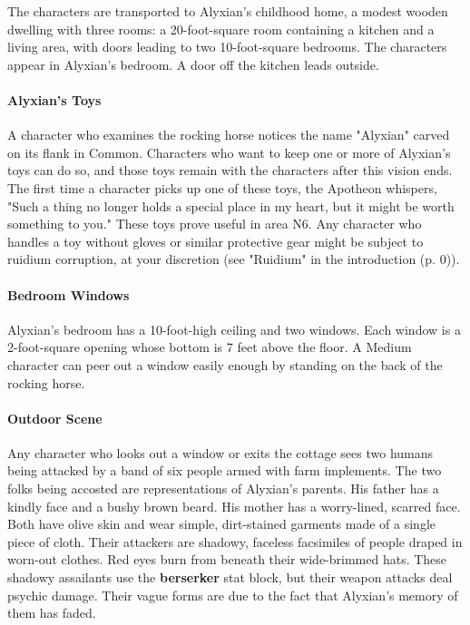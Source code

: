 \documentclass[a4paper, 11pt, bg=full, twocolumn, nooutline]{dndbook}
\begin{document}
The characters are transported to Alyxian's childhood home, a modest wooden dwelling with three rooms: a 20-foot-square room containing a kitchen and a living area, with doors leading to two 10-foot-square bedrooms. The characters appear in Alyxian's bedroom. A door off the kitchen leads outside.


\paragraph{Alyxian's Toys}

A character who examines the rocking horse notices the name "Alyxian" carved on its flank in Common. Characters who want to keep one or more of Alyxian's toys can do so, and those toys remain with the characters after this vision ends. The first time a character picks up one of these toys, the Apotheon whispers, "Such a thing no longer holds a special place in my heart, but it might be worth something to you." These toys prove useful in area N6. Any character who handles a toy without gloves or similar protective gear might be subject to ruidium corruption, at your discretion (see "Ruidium" in the introduction (p. 0)).

\paragraph{Bedroom Windows}

Alyxian's bedroom has a 10-foot-high ceiling and two windows. Each window is a 2-foot-square opening whose bottom is 7 feet above the floor. A Medium character can peer out a window easily enough by standing on the back of the rocking horse.

\paragraph{Outdoor Scene}

Any character who looks out a window or exits the cottage sees two humans being attacked by a band of six people armed with farm implements. The two folks being accosted are representations of Alyxian's parents. His father has a kindly face and a bushy brown beard. His mother has a worry-lined, scarred face. Both have olive skin and wear simple, dirt-stained garments made of a single piece of cloth. Their attackers are shadowy, faceless facsimiles of people draped in worn-out clothes. Red eyes burn from beneath their wide-brimmed hats. These shadowy assailants use the \textbf{berserker} stat block, but their weapon attacks deal psychic damage. Their vague forms are due to the fact that Alyxian's memory of them has faded.
\end{document}
